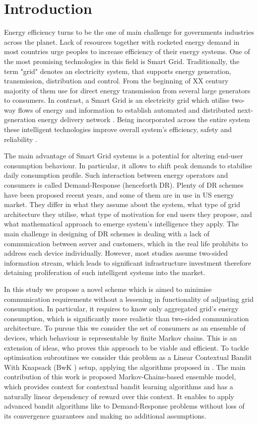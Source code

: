 \chapter{Introduction}
Energy efficiency turns to be the one of main challenge for governments industries across the planet. Lack of resources together with rocketed energy demand in most countries urge peoples to increase efficiency of their energy systems. One of the most promising technologies in this field is Smart Grid. Traditionally, the term "grid" denotes an electricity system, that supports energy generation, transmission, distribution and control. From the beginning of XX century majority of them use for direct energy transmission from several large generators to consumers. In contrast, a Smart Grid is an electricity grid which utilise two-way flows of energy and information to establish automated and distributed next-generation energy delivery network \cite{Fang2012}. Being incorporated across the entire system these intelligent technologies improve overall system's efficiency, safety and reliability \cite{Gao2012}. 

The main advantage of Smart Grid systems is a potential for altering end-user consumption behaviour. In particular, it allows to shift peak demands to stabilise daily consumption profile. Such interaction between energy operators and consumers is called Demand-Response (henceforth DR). Plenty of DR schemes have been proposed recent years, and some of them are in use in US energy market. They differ in what they assume about the system, what type of grid architecture they utilise, what type of motivation for end users they propose, and what mathematical approach to emerge system's intelligence they apply. The main challenge in designing of DR schemes is dealing with a lack of communication between server and customers, which in the real life prohibits to address each device individually. However, most studies assume two-sided information stream, which leads to significant infrastructure investment therefore detaining proliferation of such intelligent systems into the market. 

In this study we propose a novel scheme which is aimed to minimise communication requirements without a lessening in functionality of adjusting grid consumption. In particular, it requires to know only aggregated grid's energy consumption, which is significantly more realistic than two-sided communication architecture. To pursue this we consider the set of consumers as an ensemble of devices, which behaviour is representable by finite Markov chains. This is an extension of \cite{Chertkov2017} ideas, who proves this approach to be viable and efficient. To tackle optimisation subroutines we consider this problem as a Linear Contextual Bandit With Knapsack (BwK \cite{Badanidiyuru2013}) setup, applying the algorithms proposed in \cite{Agrawal2015}. The main contribution of this work is proposed Markov-Сhains-based ensemble model, which provides context for contextual bandit learning algorithms and has a naturally linear dependency of reward over this context. It enables to apply advanced bandit algorithms like \cite{Agrawal2015} to Demand-Response problems without loss of its convergence guarantees and making no additional assumptions. 



